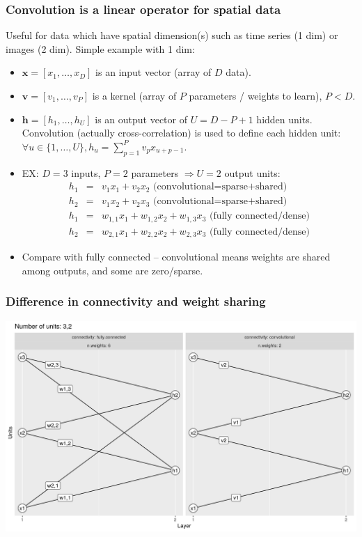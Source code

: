 \documentclass{beamer}
\begin{document}
\begin{frame}
  \frametitle{Convolution is a linear operator for spatial data}
  Useful for data which have spatial dimension(s) such as time series
  (1 dim) or images (2 dim). Simple example with 1 dim:
  \begin{itemize}
  \item $\mathbf x = [ x_1, \dots, x_D ]$ is an input vector (array of $D$ data).
  \item $\mathbf v = [ v_1, \dots, v_P ]$ is a kernel (array of $P$ parameters
    / weights to learn), $P<D$.
  \item $\mathbf h = [ h_1, \dots, h_U ]$ is an output vector of $U=D-P+1$ 
    hidden units. Convolution (actually cross-correlation) is used to
    define each hidden unit:
    $\forall u\in\{1,\dots,U\}, h_u = \sum_{p=1}^P v_p x_{u+p-1} $.
\item EX: $D=3$ inputs, $P=2$ parameters $\Rightarrow U=2$ output units:
  \begin{eqnarray*}
    h_1 &=& v_1 x_1 + v_2 x_2 \text{ (convolutional=sparse+shared)}\\ 
    h_2 &=& v_1 x_2 + v_2 x_3 \text{ (convolutional=sparse+shared)}\\
    h_1 &=& w_{1,1} x_1 + w_{1,2} x_2 + w_{1,3} x_3 \text{ (fully connected/dense)}\\ 
    h_2 &=& w_{2,1} x_1 + w_{2,2} x_2 + w_{2,3} x_3 \text{ (fully connected/dense)} 
  \end{eqnarray*}
\item Compare with fully connected -- convolutional means weights are
  shared among outputs, and some are zero/sparse.
  \end{itemize}
\end{frame}

\begin{frame}
  \frametitle{Difference in connectivity and weight sharing}
  \includegraphics[width=\textwidth]{figure-convolutional-3-2}
\end{frame}
\end{document}
